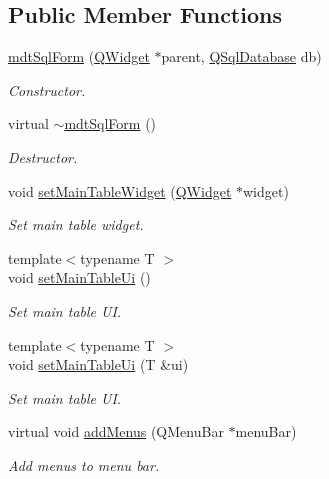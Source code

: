 \subsection*{Public Member Functions}
\begin{DoxyCompactItemize}
\item 
\hyperlink{classmdt_sql_form_a607993f0d35207668c0f220d77bd9298}{mdt\-Sql\-Form} (\hyperlink{class_q_widget}{Q\-Widget} $\ast$parent, \hyperlink{class_q_sql_database}{Q\-Sql\-Database} db)
\begin{DoxyCompactList}\small\item\em Constructor. \end{DoxyCompactList}\item 
virtual \hyperlink{classmdt_sql_form_ab4538979323566433a20bb71118525a5}{$\sim$mdt\-Sql\-Form} ()
\begin{DoxyCompactList}\small\item\em Destructor. \end{DoxyCompactList}\item 
void \hyperlink{classmdt_sql_form_ab1fee5cecde1e2faf4b4c1bf1ee672b1}{set\-Main\-Table\-Widget} (\hyperlink{class_q_widget}{Q\-Widget} $\ast$widget)
\begin{DoxyCompactList}\small\item\em Set main table widget. \end{DoxyCompactList}\item 
{\footnotesize template$<$typename T $>$ }\\void \hyperlink{classmdt_sql_form_ae3651d94b995dc84665f934ba9c7458f}{set\-Main\-Table\-Ui} ()
\begin{DoxyCompactList}\small\item\em Set main table U\-I. \end{DoxyCompactList}\item 
{\footnotesize template$<$typename T $>$ }\\void \hyperlink{classmdt_sql_form_ab4e3d6512a68eba681be79d1602b6d44}{set\-Main\-Table\-Ui} (T \&ui)
\begin{DoxyCompactList}\small\item\em Set main table U\-I. \end{DoxyCompactList}\item 
virtual void \hyperlink{classmdt_sql_form_a696cdbda10abab368ca9cbf1bbdd1bf1}{add\-Menus} (Q\-Menu\-Bar $\ast$menu\-Bar)
\begin{DoxyCompactList}\small\item\em Add menus to menu bar. \end{DoxyCompactList}\item 

\end{DoxyCompactItemize}
